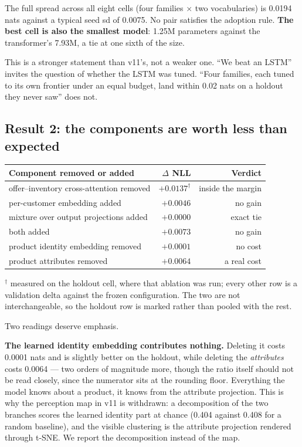 \documentclass[11pt]{article}
\begin{document}
\noindent The full spread across all eight cells (four families $\times$ two
vocabularies) is 0.0194 nats against a typical seed sd of 0.0075. No pair
satisfies the adoption rule. \textbf{The best cell is also the smallest model}:
1.25M parameters against the transformer's 7.93M, a tie at one sixth of the
size.

This is a stronger statement than v11's, not a weaker one. ``We beat an LSTM''
invites the question of whether the LSTM was tuned. ``Four families, each tuned
to its own frontier under an equal budget, land within 0.02 nats on a holdout
they never saw'' does not.

\subsection*{Result 2: the components are worth less than expected}

\begin{center}\small
\begin{tabular}{lrr}
\toprule
Component removed or added & $\Delta$ NLL & Verdict \\
\midrule
offer--inventory cross-attention removed & $+0.0137^{\dagger}$ & inside the margin \\
per-customer embedding added & $+0.0046$ & no gain \\
mixture over output projections added & $+0.0000$ & exact tie \\
both added & $+0.0073$ & no gain \\
product identity embedding removed & $+0.0001$ & no cost \\
product attributes removed & $+0.0064$ & a real cost \\
\bottomrule
\end{tabular}
\end{center}

\noindent $^{\dagger}$ measured on the holdout cell, where that ablation was run;
every other row is a validation delta against the frozen configuration. The two
are not interchangeable, so the holdout row is marked rather than pooled with
the rest.

\noindent Two readings deserve emphasis.

\textbf{The learned identity embedding contributes nothing.} Deleting it costs
0.0001 nats and is slightly better on the holdout, while deleting the
\emph{attributes} costs 0.0064 --- two orders of magnitude more, though the
ratio itself should not be read closely, since the numerator sits at the
rounding floor. Everything the model knows about a product, it knows from
the attribute projection. This is why the perception map in v11 is withdrawn: a
decomposition of the two branches scores the learned identity part at chance
(0.404 against 0.408 for a random baseline), and the visible clustering is the
attribute projection rendered through t-SNE. We report the decomposition instead
of the map.
\end{document}
